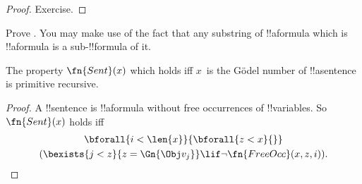 \documentclass[../../../include/open-logic-section]{subfiles}
\begin{document}
\begin{proof}
Exercise.
\end{proof}

\begin{prob}
Prove .  You may make use
of the fact that any substring of !!a{formula} which is !!a{formula}
is a sub-!!{formula} of it.
\end{prob}

\begin{prop}
The property $\fn{Sent}(x)$ which holds iff $x$~is the G\"odel
number of !!a{sentence} is primitive recursive.
\end{prop}

\begin{proof}
A !!{sentence} is !!a{formula} without free occurrences of
!!{variable}s. So $\fn{Sent}(x)$ holds iff
\begin{multline*}
\bforall{i<\len{x}}{\bforall{z<x}{}}\\
(\bexists{j<z}{z=\Gn{\Obj v_j}} \lif \lnot\fn{FreeOcc}(x,z,i)).
\end{multline*}
\end{proof}
\end{document}
